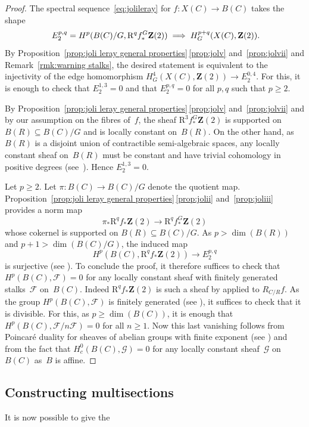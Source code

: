 \documentclass[JEP,XML,SOM,Unicode]{cedram}
\newcommand\implique{\mathchoice{\implies}{\Rightarrow}{\Rightarrow}{\Rightarrow}}
\theoremstyle{plain}
\theoremstyle{definition}
\numberwithin{equation}{section}
\newcommand{\sF}{{\mathscr F}}
\newcommand{\sG}{{\mathscr G}}
\newcommand{\Z}{{\mathbf Z}}
\newcommand{\RR}{{\mathrm{R}}}
\begin{document}
\begin{proof}
The spectral sequence~\eqref{eq:jolileray} for $f:X(C)\to B(C)$
takes the shape
\[
E_2^{p,q}=H^p(B(C)/G,\RR^q f^G_* \Z(2)) \implique H^{p+q}_G(X(C),\Z(2))\rlap{.}
\]
By Proposition~\ref{prop:joli leray general properties}\,\eqref{prop:jolv} and~\eqref{prop:jolvii}
and Remark~\ref{rmk:warning stalks},
the desired statement is equivalent to the injectivity of
the edge homomorphism
$H^4_G(X(C),\Z(2)) \to E_2^{0,4}$.
For this, it is enough to check that $E_2^{1,3}=0$ and that $E_2^{p,q}=0$ for all $p,q$ such that $p\geq 2$.

By Proposition~\ref{prop:joli leray general properties}\,\eqref{prop:jolv} and~\eqref{prop:jolvii} and by our assumption
on the fibres of~$f$, the sheaf $\RR^3 f^G_* \Z(2)$ is supported on $B(R) \subseteq B(C)/G$
and is locally constant on~$B(R)$.
On the other hand, as~$B(R)$ is a disjoint union of contractible semi-algebraic spaces,
any locally constant sheaf on~$B(R)$ must be constant and have trivial cohomology in positive
degrees (see~\cite[Ch.\,II, Th.\,2.5]{delfshomology}). Hence $E_2^{1,3}=0$.

Let $p\geq 2$.
Let $\pi:B(C)\to B(C)/G$ denote the quotient map.
Proposition~\ref{prop:joli leray general properties}\,\eqref{prop:jolii} and~\eqref{prop:joliii}
provides a norm map
\[
\pi_*\RR^qf_*\Z(2) \to \RR^qf^G_*\Z(2)
\]
whose cokernel is supported on $B(R) \subseteq B(C)/G$.
As $p>\dim(B(R))$ and $p+1>\dim(B(C)/G)$,
the induced map
\[
H^p(B(C),\RR^qf_*\Z(2)) \to E_2^{p,q}
\]
is surjective
(see \cite[Ch.\,II, Lem.\,9.1]{delfshomology}).
To conclude the proof,
it therefore suffices
to check that $H^p(B(C),\sF)=0$
for any locally constant sheaf with finitely generated stalks~$\sF$ on~$B(C)$.
Indeed $\RR^qf_*\Z(2)$ is such a sheaf
by \cite[Cor.\,17.20]{scheiderer} applied to $R_{C/R}f$.
As the group $H^p(B(C),\sF)$ is finitely generated
(see \cite[Th.\,17.9]{scheiderer}), it suffices to check that it is divisible.
For this,
as $p\geq\dim(B(C))$,
it is enough that $H^p(B(C),\sF/n\sF)=0$ for all $n\geq 1$.
Now this last vanishing follows from Poincaré duality for sheaves of abelian groups
with finite exponent
(see \cite[(\ref*{BW1-eq:semi-algebraic poincare duality})]{BW1})
and from the fact that $H^0_c(B(C),\sG)=0$
for any locally constant sheaf~$\sG$ on~$B(C)$ as~$B$ is affine.
\end{proof}

\subsection{Constructing multisections}
\label{subsec:horizontal}
It is now possible to give the
\end{document}
